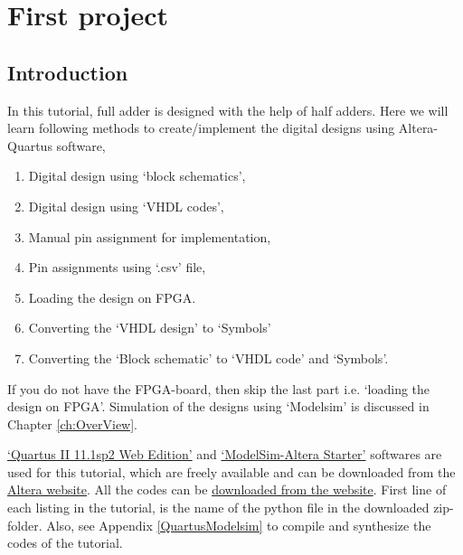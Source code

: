 \chapter{First project} \label{ch:FirstProject}

\graphicspath{{Chapters/FirstProject/Figures/}}


%

\section{Introduction}
In this tutorial, full adder is designed with the help of half adders. Here we will learn following methods to create/implement the digital designs using Altera-Quartus software, 

\begin{enumerate}
	\item Digital design using `block schematics',
	\item Digital design using `VHDL codes',
	\item Manual pin assignment for implementation,
	\item Pin assignments using `.csv' file,
	\item Loading the design on FPGA. 
	\item Converting the `VHDL design' to `Symbols'
	\item Converting the `Block schematic' to `VHDL code' and `Symbols'. 
\end{enumerate}

If you do not have the FPGA-board, then skip the last part i.e. `loading the design on FPGA'. Simulation of the designs using `Modelsim' is discussed in Chapter \ref{ch:OverView}. 

\href{https://www.altera.com/downloads/software/quartus-ii-we/111sp2.html}{`Quartus II 11.1sp2 Web Edition'} and \href{https://www.altera.com/downloads/software/modelsim-starter/111.html}{`ModelSim-Altera Starter'} softwares are used for this tutorial, which are freely available and can be downloaded from the \href{https://www.altera.com/downloads/download-center.html}{Altera website}. All the codes can be \href{http://pythondsp.readthedocs.io/en/latest/pythondsp/toc.html}{downloaded from the website}. First line of each listing in the tutorial, is the name of the python file in the downloaded zip-folder. Also, see Appendix \ref{QuartusModelsim} to compile and synthesize the codes of the tutorial.

